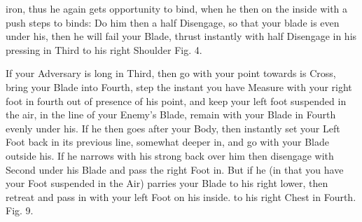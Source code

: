\newpage


\newpage


iron, thus he again gets opportunity to bind, when he then on the
inside with a push steps to binds: Do him then a half Disengage, so
that your blade is even under his, then he will fail your Blade,
thrust instantly with half Disengage in his pressing in Third to his
right Shoulder Fig. 4.

If your Adversary is long in Third, then go with your point towards is
Cross, bring your Blade into Fourth, step the instant you have Measure
with your right foot in fourth out of presence of his point, and keep
your left foot suspended in the air, in the line of your Enemy's
Blade, remain with your Blade in Fourth evenly under his.
If he then goes after your Body, then instantly set your Left Foot
back in its previous line, somewhat deeper in, and go with your Blade
outside his. If he narrows with his strong back over him then
disengage with Second under his Blade and pass the right Foot in. But
if he (in that you have your Foot suspended in the Air) parries your
Blade to his right lower, then retreat and pass in with your left Foot
on his inside. to his right Chest in Fourth. Fig. 9.

